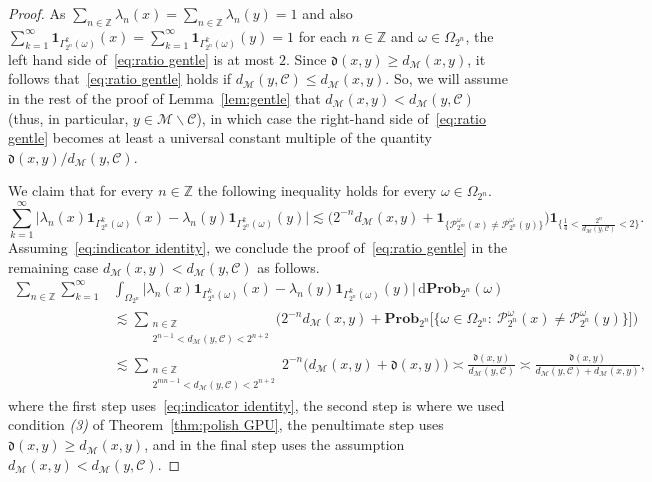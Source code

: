\documentclass[11pt,reqno]{amsart}
\renewcommand{\le}{\leqslant}
\renewcommand{\ge}{\geqslant}
\renewcommand{\setminus}{\smallsetminus}
\newcommand{\ud}[0]{\,\mathrm{d}}
\theoremstyle{remark}
\newcommand{\MM}{\mathcal{M}}
\newcommand{\Z}{\mathbb Z}
\renewcommand{\Pr}{\mathbf{Prob}}
\newcommand{\sub}{\mathscr{C}}
\renewcommand{\1}{\mathbf 1}
\begin{document}
\begin{proof}
As $\sum_{n\in \Z}\lambda_n(x)=\sum_{n\in \Z}\lambda_n(y)=1$  and also $\sum_{k=1}^\infty \1_{\Gamma_{2^n}^k(\omega)}(x)=\sum_{k=1}^\infty \1_{\Gamma_{2^n}^k(\omega)}(y)=1$ for each $n\in \Z$ and  $\omega\in \Omega_{2^n}$, the left hand side of~\eqref{eq:ratio gentle} is at most $2$. Since $\mathfrak{d}(x,y)\ge d_\MM(x,y)$, it follows that~\eqref{eq:ratio gentle} holds if $d_{\MM}(y,\sub)\le d_{\MM}(x,y)$. So, we will assume in the rest of the proof of  Lemma~\ref{lem:gentle} that $d_{\MM}(x,y)<d_{\MM}(y,\sub)$ (thus, in particular, $y\in \MM\setminus \sub$), in which case the right-hand side of~\eqref{eq:ratio gentle} becomes at least a universal constant multiple of the quantity $\mathfrak{d}(x,y)/d_{\MM}(y,\sub)$.

We claim that for every $n\in \Z$ the following inequality holds for every $\omega\in \Omega_{2^n}$.
\begin{equation}\label{eq:indicator identity}
\sum_{k=1}^\infty \big|\lambda_n(x)\1_{\Gamma_{2^n}^k(\omega)}(x)-\lambda_n(y)\1_{\Gamma_{2^n}^k(\omega)}(y)\big|\lesssim \Big(2^{-n}d_{\MM}(x,y)+\1_{\big\{\mathscr{P}_{2^m}^\omega(x)\neq \mathscr{P}_{2^n}^\omega(y)\big\}}\Big)\1_{\big\{\frac14<\frac{2^n}{d_{\MM}(y,\sub)}< 2\big\}}.
\end{equation}
Assuming~\eqref{eq:indicator identity}, we conclude the proof of~\eqref{eq:ratio gentle} in the remaining case $d_{\MM}(x,y)<d_{\MM}(y,\sub)$ as follows.
\begin{align*}
\sum_{n\in \Z}\sum_{k=1}^\infty&\int_{\Omega_{2^n}} \big|\lambda_n(x)\1_{\Gamma_{2^n}^k(\omega)}(x)-\lambda_{n}(y)\1_{\Gamma_{2^n}^k(\omega)}(y)\big|\ud\Pr_{2^n}(\omega)\\
&\lesssim \sum_{\substack{n\in \Z\\ 2^{n-1}< d_{\MM}(y,\sub)< 2^{n+2}}} \Big(2^{-n}d_{\MM}(x,y)+\Pr_{2^n}\big[\{\omega\in \Omega_{2^n}:\ \mathscr{P}_{2^n}^\omega(x)\neq \mathscr{P}_{2^n}^\omega(y)\}\big]\Big)\\
&\lesssim  \sum_{\substack{n\in \Z\\ 2^{mn-1}< d_{\MM}(y,\sub)< 2^{n+2}}} 2^{-n}\big(d_{\MM}(x,y)+\mathfrak{d}(x,y)\big)\asymp \frac{\mathfrak{d}(x,y)}{d_{\MM}(y,\sub)}\asymp \frac{ \mathfrak{d}(x,y)}{d_{\MM}(y,\sub)+d_{\MM}(x,y)},
\end{align*}
where the first step uses~\eqref{eq:indicator identity}, the second step is where we used condition {\em (3)} of Theorem~\ref{thm:polish GPU}, the penultimate step uses $\mathfrak{d}(x,y)\ge d_\MM(x,y)$, and in the final step uses the assumption $d_{\MM}(x,y)<d_{\MM}(y,\sub)$.



\end{proof}
\end{document}
